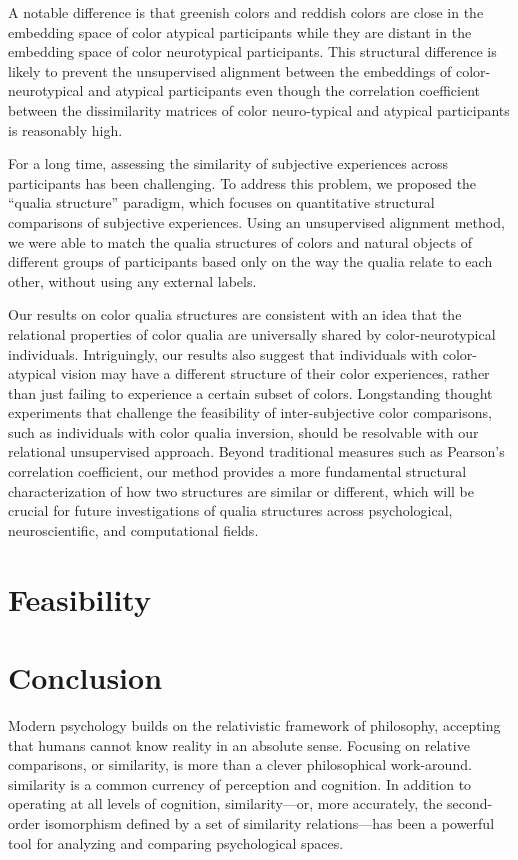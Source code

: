 \documentclass[
  authoryear]{elsarticle}
\begin{document}
A notable difference is that greenish colors and reddish colors are
close in the embedding space of color atypical participants while they
are distant in the embedding space of color neurotypical participants.
This structural difference is likely to prevent the unsupervised
alignment between the embeddings of color-neurotypical and atypical
participants even though the correlation coefficient between the
dissimilarity matrices of color neuro-typical and atypical participants
is reasonably high.

For a long time, assessing the similarity of subjective experiences
across participants has been challenging. To address this problem, we
proposed the ``qualia structure'' paradigm, which focuses on
quantitative structural comparisons of subjective experiences. Using an
unsupervised alignment method, we were able to match the qualia
structures of colors and natural objects of different groups of
participants based only on the way the qualia relate to each other,
without using any external labels.

Our results on color qualia structures are consistent with an idea that
the relational properties of color qualia are universally shared by
color-neurotypical individuals. Intriguingly, our results also suggest
that individuals with color-atypical vision may have a different
structure of their color experiences, rather than just failing to
experience a certain subset of colors. Longstanding thought experiments
that challenge the feasibility of inter-subjective color comparisons,
such as individuals with color qualia inversion, should be resolvable
with our relational unsupervised approach. Beyond traditional measures
such as Pearson's correlation coefficient, our method provides a more
fundamental structural characterization of how two structures are
similar or different, which will be crucial for future investigations of
qualia structures across psychological, neuroscientific, and
computational fields.

\section{Feasibility}\label{feasibility}

\section{Conclusion}\label{conclusion}

Modern psychology builds on the relativistic framework of philosophy,
accepting that humans cannot know reality in an absolute sense. Focusing
on relative comparisons, or similarity, is more than a clever
philosophical work-around. similarity is a common currency of perception
and cognition. In addition to operating at all levels of cognition,
similarity---or, more accurately, the second-order isomorphism defined
by a set of similarity relations---has been a powerful tool for
analyzing and comparing psychological spaces.


  
\end{document}
